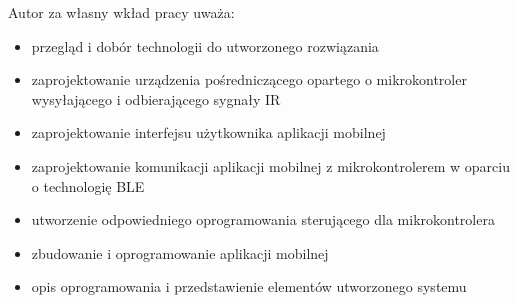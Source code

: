 \documentclass[12pt,twoside,draft]{article}
\begin{document}
Autor za własny wkład pracy uważa: 
\begin{itemize}[label=-,labelsep=0.4cm,leftmargin=0.65cm]
   \item przegląd i dobór technologii do utworzonego rozwiązania
   \item zaprojektowanie urządzenia pośredniczącego opartego o mikrokontroler wysyłającego i odbierającego sygnały IR
   \item zaprojektowanie interfejsu użytkownika aplikacji mobilnej
   \item zaprojektowanie komunikacji aplikacji mobilnej z mikrokontrolerem w oparciu o technologię BLE
   \item utworzenie odpowiedniego oprogramowania sterującego dla mikrokontrolera
   \item zbudowanie i oprogramowanie aplikacji mobilnej
   \item opis oprogramowania i przedstawienie elementów utworzonego systemu
   
\end{itemize}

\clearpage
{}



\clearpage

\makesummary
\end{document}

